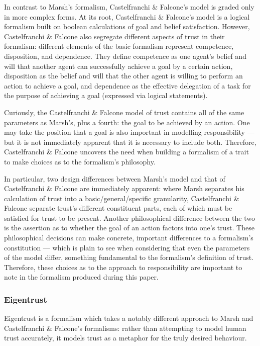 In contrast to Marsh's formalism, Castelfranchi \& Falcone's model is graded only in more complex forms. At its root, Castelfranchi \& Falcone's model is a logical formalism built on boolean calculations of goal and belief satisfaction. However, Castelfranchi \& Falcone also segregate different aspects of trust in their formalism: different elements of the basic formalism represent competence, disposition, and dependence. They define competence as one agent's belief and will that another agent can successfully achieve a goal by a certain action, disposition as the belief and will that the other agent is willing to perform an action to achieve a goal, and dependence as the effective delegation of a task for the purpose of achieving a goal (expressed via logical statements).\par

Curiously, the Castelfranchi \& Falcone model of trust contains all of the same parameters as Marsh's, plus a fourth: the goal to be achieved by an action. One may take the position that a goal is also important in modelling responsibility --- but it is not immediately apparent that it is necessary to include both. Therefore, Castelfranchi \& Falcone uncovers the need when building a formalism of a trait to make choices as to the formalism's philosophy.\par

In particular, two design differences between Marsh's model and that of Castelfranchi \& Falcone are immediately apparent: where Marsh separates his calculation of trust into a basic/general/specific granularity, Castelfranchi \& Falcone separate trust's different constituent parts, each of which must be satisfied for trust to be present. Another philosophical difference between the two is the assertion as to whether the goal of an action factors into one's trust. These philosophical decisions can make concrete, important differences to a formalism's constitution --- which is plain to see when considering that even the parameters of the model differ, something fundamental to the formalism's definition of trust. Therefore, these choices as to the approach to responsibility are important to note in the formalism produced during this paper.\par

\subsubsection{Eigentrust~\cite{eigentrust}}
Eigentrust\cite{eigentrust} is a formalism which takes a notably different approach to Marsh and Castelfranchi \& Falcone's formalisms: rather than attempting to model human trust accurately, it models trust as a metaphor for the truly desired behaviour.\par

